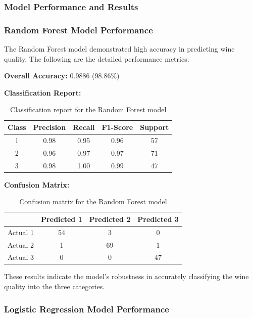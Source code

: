 \documentclass[twocolumn]{article}
\begin{document}
	\subsubsection{Model Performance and Results}
 
	\subsubsection{Random Forest Model Performance}
	The Random Forest model demonstrated high accuracy in predicting wine quality.
	The following are the detailed performance metrics:
    \smallskip

	\textbf{Overall Accuracy:} 0.9886 (98.86\%)
    \smallskip

	\textbf{Classification Report:}
	\begin{table}[H]
		\centering
		\begin{tabular}{|c|c|c|c|c|}
			\hline
			Class & Precision & Recall & F1-Score & Support \\
			\hline
			1     & 0.98      & 0.95   & 0.96     & 57      \\
			\hline
			2     & 0.96      & 0.97   & 0.97     & 71      \\
			\hline
			3     & 0.98      & 1.00   & 0.99     & 47      \\
			\hline
		\end{tabular}
		\caption{Classification report for the Random Forest model}
	\end{table}

	\textbf{Confusion Matrix:}
	\begin{table}[H]
		\centering
		\begin{tabular}{|c|c|c|c|}
			\hline
			         & Predicted 1 & Predicted 2 & Predicted 3 \\
			\hline
			Actual 1 & 54          & 3           & 0           \\
			\hline
			Actual 2 & 1           & 69          & 1           \\
			\hline
			Actual 3 & 0           & 0           & 47          \\
			\hline
		\end{tabular}
		\caption{Confusion matrix for the Random Forest model}
	\end{table}

	These results indicate the model's robustness in accurately classifying the
	wine quality into the three categories.

	\subsubsection{Logistic Regression Model Performance}
\end{document}
